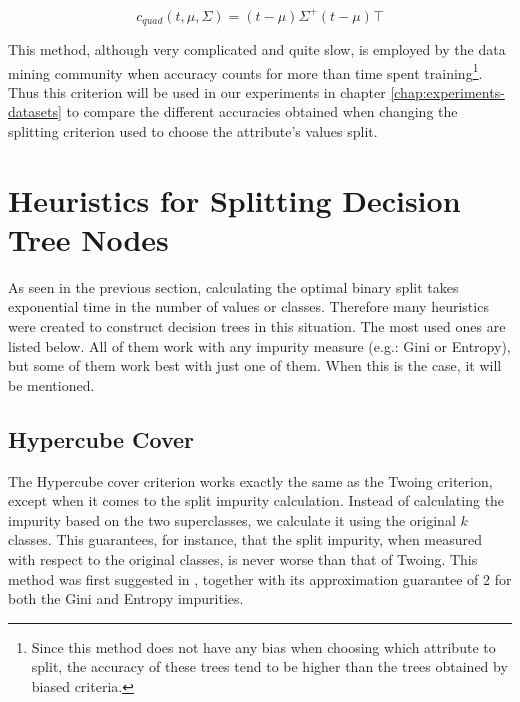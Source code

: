 \begin{equation}
\label{eq:c_quad}
c_{quad}(t, \mu, \Sigma) = (t-\mu)\Sigma^+(t-\mu)\top
\end{equation}

This method, although very complicated and quite slow, is employed by the data mining community when accuracy counts for more than time spent training\footnote{Since this method does not have any bias when choosing which attribute to split, the accuracy of these trees tend to be higher than the trees obtained by biased criteria.}. Thus this criterion will be used in our experiments in chapter \ref{chap:experiments-datasets} to compare the different accuracies obtained when changing the splitting criterion used to choose the attribute's values split.

\section{Heuristics for Splitting Decision Tree Nodes}
As seen in the previous section, calculating the optimal binary split takes exponential time in the number of values or classes. Therefore many heuristics were created to construct decision trees in this situation. The most used ones are listed below. All of them work with any impurity measure (e.g.: Gini or Entropy), but some of them work best with just one of them. When this is the case, it will be mentioned.

\subsection{Hypercube Cover}

The Hypercube cover criterion works exactly the same as the Twoing criterion, except when it comes to the split impurity calculation. Instead of calculating the impurity based on the two superclasses, we calculate it using the original $k$ classes. This guarantees, for instance, that the split impurity, when measured with respect to the original classes, is never worse than that of Twoing. This method was first suggested in \cite{icml2018}, together with its approximation guarantee of 2 for both the Gini and Entropy impurities.


%
%
